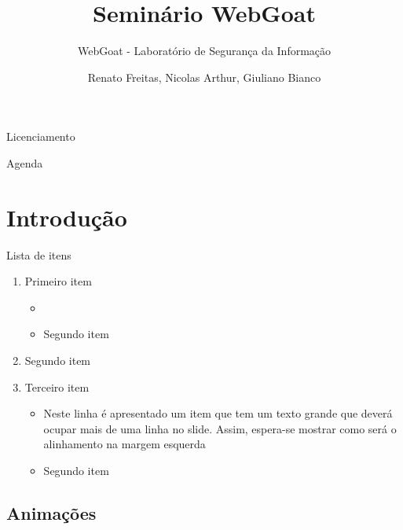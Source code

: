 \documentclass[aspectratio=169]{beamer}
\title{Seminário WebGoat}
\subtitle{WebGoat - Laboratório de Segurança da Informação}
\author{Renato Freitas, Nicolas Arthur, Giuliano Bianco}
\begin{document}

\begin{frame}
    \maketitle
\end{frame}

\begin{frame}{Licenciamento}
    \licenciamentoLivre
\end{frame}

\begin{frame}{Agenda}
    \tableofcontents
\end{frame}


\section{Introdução}


\begin{frame}{Lista de itens}
    \begin{enumerate}
        \item Primeiro item
        \begin{itemize}
            \item {}
            \item Segundo item
        \end{itemize}
        \item Segundo item
        \item Terceiro item 
        \begin{itemize}
            \item Neste linha é apresentado um item que tem um texto grande que deverá ocupar mais de uma linha no slide. Assim, espera-se mostrar como será o alinhamento na margem esquerda
            \item Segundo item
        \end{itemize}
    \end{enumerate}
\end{frame}

\subsection{Animações}
\end{document}
